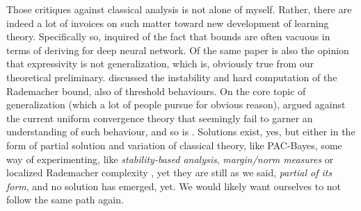 \documentclass[10pt]{article}
\begin{document}
Those critiques against classical analysis is not alone of myself. Rather, there are indeed a lot of invoices on such matter toward new development of learning theory. Specifically so, \cite{zhang2017understandingdeeplearningrequires} inquired of the fact that bounds are often vacuous in terms of deriving for deep neural network. Of the same paper is also the opinion that expressivity is not generalization, which is, obviously true from our theoretical preliminary. \cite{truong2025rademachercomplexitybasedgeneralizationbounds} discussed the instability and hard computation of the Rademacher bound, also of threshold behaviours. On the core topic of generalization (which a lot of people pursue for obvious reason), \cite{nagarajan2021uniformconvergenceunableexplain} argued against the current uniform convergence theory that seemingly fail to garner an understanding of such behaviour, and so is \cite{tunali2019empirical}. Solutions exist, yes, but either in the form of partial solution and variation of classical theory, like PAC-Bayes, some way of experimenting, like \textit{stability-based analysis}, \textit{margin/norm measures} or localized Rademacher complexity \cite{bartlett2005local,bartlett2017spectrally,bousquet2002stability,neyshabur2015norm}, yet they are still as we said, \textit{partial of its form}, and no solution has emerged, yet. We would likely want ourselves to not follow the same path again. 
\end{document}
